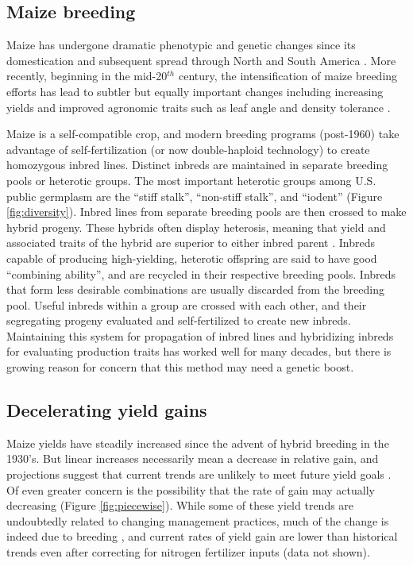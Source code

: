 \documentclass[12pt]{article}
\begin{document}
\subsection*{Maize breeding}
Maize has undergone dramatic phenotypic and genetic changes since its domestication and subsequent spread through North and South America \citep{daFonseca:2015ey,Doebley:2004ce}. More recently, beginning in the mid-20$^{th}$ century, the intensification of maize breeding efforts has lead to subtler but equally important changes including increasing yields and improved agronomic traits such as leaf angle and density tolerance \citep{duvick2005contribution}. 

Maize is  a self-compatible crop, and modern breeding programs (post-1960) take advantage of self-fertilization (or now double-haploid technology) to create homozygous inbred lines. 
Distinct inbreds are maintained in separate breeding pools or heterotic groups.
The most important heterotic groups among U.S. public germplasm are the ``stiff stalk'', ``non-stiff stalk'', and ``iodent'' (Figure \ref{fig:diversity}).
Inbred lines from separate breeding pools are then crossed to make hybrid progeny.  
These hybrids often display heterosis, meaning that yield and associated traits of the hybrid are superior to  either inbred parent \citep{Springer:2007bj}.  
Inbreds capable of producing high-yielding, heterotic offspring are said to have good ``combining ability'', and are recycled in their respective breeding pools.
Inbreds that form less desirable combinations are usually discarded from the breeding pool. 
Useful inbreds within a group are crossed with each other, and their segregating progeny evaluated and self-fertilized to create new inbreds. 
Maintaining this system for propagation of inbred lines and hybridizing inbreds for evaluating production traits has worked well for many decades, but there is growing reason for concern that this method may need a genetic boost. 

\subsection*{Decelerating yield gains} 

Maize yields have steadily increased since the advent of hybrid breeding in the 1930's.
But linear increases necessarily mean a decrease in relative gain, and projections suggest that current trends are unlikely to meet future yield goals \citep{grassini2013distinguishing}. 
Of even greater concern is the possibility that the rate of gain may actually decreasing (Figure \ref{fig:piecewise}).
While some of these yield trends are undoubtedly related to changing management practices, much of the change is indeed due to breeding \citep{Duvick:2001fy}, and current rates of yield gain are lower than historical trends even after correcting for nitrogen fertilizer inputs (data not shown). 
\end{document}
